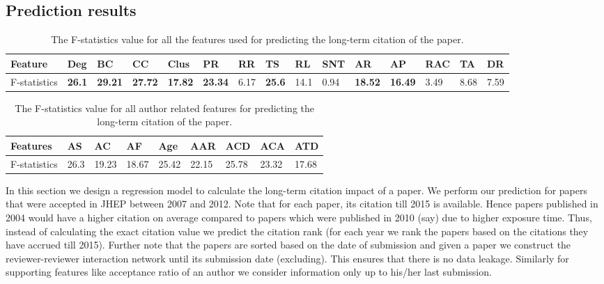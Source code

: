 \subsection{Prediction results}
\label{performance_measure}

\begin{table*}[]
\centering
\caption{The F-statistics value for all the features used for predicting the long-term citation of the paper.}
\label{tab:f_score}
 \begin{adjustbox}{max width=\textwidth}
\begin{tabular}{|l|l|l|l|l|l|l|l|l|l|l|l|l|l|l|}
\hline
Feature      & Deg  & BC    & CC    & Clus  & PR    & RR   & TS   & RL   & SNT  & AR    & AP    & RAC  & TA   & DR   \\ \hline
F-statistics & {\bf 26.1} & {\bf 29.21} & {\bf 27.72} & {\bf 17.82} & {\bf 23.34} & 6.17 & {\bf 25.6} & 14.1 & 0.94 & {\bf 18.52} & {\bf 16.49} & 3.49 & 8.68 & 7.59 \\ \hline
\end{tabular}
\end{adjustbox}
\vspace{4mm}
\end{table*}

\begin{table*}[]
\centering
\caption{The F-statistics value for all author related features for predicting the long-term citation of the paper.}
\label{tab:fscore_author}
\begin{tabular}{|l|l|l|l|l|l|l|l|l|}
\hline
Features     & AS   & AC    & AF    & Age   & AAR   & ACD   & ACA   & ATD   \\ \hline
F-statistics & 26.3 & 19.23 & 18.67 & 25.42 & 22.15 & 25.78 & 23.32 & 17.68 \\ \hline
\end{tabular}
\vspace{4mm}
\end{table*}

In this section we design a regression model to calculate the long-term citation impact of a paper. 
We perform our prediction for papers that were accepted in JHEP between 2007 and 2012. Note that for each paper, its citation till 2015 is available. Hence papers published in 2004 would have a higher citation on average compared to papers which were published in 2010 (say) due to higher exposure time. Thus, instead of calculating  the exact citation value we predict the citation rank (for each year we rank the papers based on the citations they have accrued till 2015). Further note that the papers are sorted based on the date of submission and given a paper we construct the reviewer-reviewer interaction network until its submission date (excluding). This ensures that there is no data leakage. Similarly for supporting features like acceptance ratio of an author we consider information only up to his/her last submission. 

